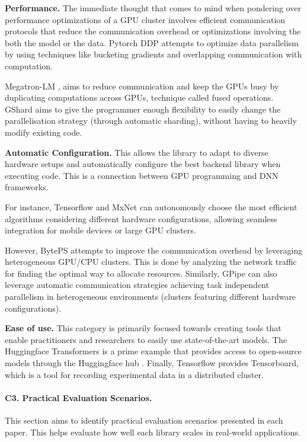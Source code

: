 \textbf{Performance.}
The immediate thought that comes to mind when pondering over performance optimizations of a GPU cluster involves
efficient communication protocols that reduce the communication overhead or optimizations involving the
both the model or the data. Pytorch DDP \cite{li_pytorch_2020} attempts to optimize data parallelism by
using techniques like bucketing gradients and overlapping communication with computation.

Megatron-LM \cite{shoeybi_megatron-lm_2020}, aims to reduce communication and keep the GPUs busy by
duplicating computations across GPUs, technique called fused operations. GShard
\cite{lepikhin_gshard_2020} aims to give the programmer enough flexibility to easily change the
parallelisation strategy (through automatic sharding), without having to heavily modify existing
code.

\textbf{Automatic Configuration.}
This allows the library to adapt to diverse hardware setups and automatically configure the best
backend library when executing code. This is a connection between GPU programming and DNN frameworks.

For instance, Tensorflow \cite{abadi_tensorflow_2016} and MxNet \cite{chen_mxnet_2015} can
autonomously choose the most efficient algorithms considering different hardware configurations,
allowing seamless integration for mobile devices or large GPU clusters.

However, BytePS \cite{jiang_unified_nodate} attempts to improve the communication overhead by
leveraging heterogeneous GPU/CPU clusters. This is done by analyzing the network traffic for
finding the optimal way to allocate resources. Similarly, GPipe \cite{huang_gpipe_2019} can also
leverage automatic communication strategies achieving task independent parallelism in heterogeneous
environments (clusters featuring different hardware configurations).

\textbf{Ease of use.}
This category is primarily focused towards creating tools that enable practitioners and researchers to easily
use state-of-the-art models. The Huggingface Transformers \cite{wolf_huggingfaces_2020} is a prime example
that provides access to open-source models through the Huggingface hub \cite{noauthor_hugging_2025}.
Finally, Tensorflow \cite{abadi_tensorflow_2016} provides Tensorboard, which is a tool for recording
experimental data in a distributed cluster.

\paragraph{C3. Practical Evaluation Scenarios.}
This section aims to identify practical evaluation scenarios presented in each paper. This helps
evaluate how well each library scales in real-world applications.

